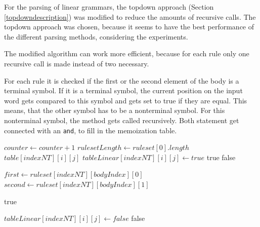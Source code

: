 \documentclass[a4paper, 11pt]{article}
\begin{document}
For the parsing of linear grammars, the topdown approach (Section \ref{topdowndescription}) was modified to reduce the amounts of recursive calls. The topdown approach was chosen, because it seems to have the best performance of the different parsing methods, considering the experiments.

The modified algorithm can work more efficient, because for each rule only one recursive call is made instead of two necessary.

For each rule it is checked if the first or the second element of the body is  a terminal symbol. If it is a terminal symbol, the current position on the input word gets compared to this symbol and gets set to true if they are equal. This means, that the other symbol has to be a nonterminal symbol. For this nonterminal symbol, the method gets called recursively. Both statement get connected with an \texttt{and}, to fill in the memoization table.


\begin{center}
\begin{algorithmic}[1]
\State $counter \gets counter+1$
\State $rulesetLength \gets ruleset[0].length$
	\State \Return $table[indexNT][i][j]$
\EndIf
{}
		\State $tableLinear[indexNT][i][j] \gets true$
		\State \Return true
	\EndIf
	\EndFor
	\State \Return false
\EndIf 

		\State $first \gets ruleset[indexNT][bodyIndex][0]$
		\State $second \gets ruleset[indexNT][bodyIndex][1]$
			\EndIf
			\EndIf
		\EndFor
	\EndIf
\EndFor

	\State \Return true
\EndIf

\State $tableLinear[indexNT][i][j] \gets false$
\State \Return false
\end{algorithmic}
\hrulefill
\end{center}
\end{document}
